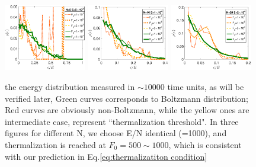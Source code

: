 \documentclass[aps,preprintnumbers,onecolumn,amsmath,amssymb,floatfix,pra]{revtex4-1}
\begin{document}
\begin{figure}[h]
\centering
\includegraphics[width=0.32\textwidth]{ZhiyuPictures/N=5_energydistribution_500_400_Font16.eps} 
\includegraphics[width=0.32\textwidth]{ZhiyuPictures/N=10_energydistribution_500_400_Font16.eps}
\includegraphics[width=0.32\textwidth]{ZhiyuPictures/N=20_energydistribution_500_400_Font16.eps}
\caption{the energy distribution measured in $\sim 10000$ time units, as will be verified later, Green curves corresponds to Boltzmann distribution; Red curves are obviously non-Boltzmann, while the yellow ones are intermediate case, represent ``thermalization threshold". In three figures for different N, we choose E/N identical (=1000), and thermalization is reached at $F_0=500\sim1000$, which is consistent with our prediction in Eq.\ref{eq:thermalizatiton condition}}
\label{fig:thermalization5}
\end{figure}


\end{document}
